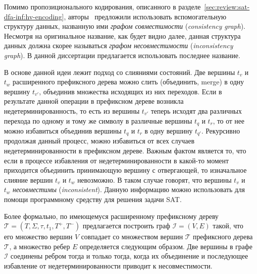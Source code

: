 Помимо пропозиционального кодирования, описанного в разделе~\ref{sec:review:sat-dfa-inf:hv-encoding}, авторы~\cite{heule-icgi10} предложили использовать вспомогательную структуру данных, названную ими \emph{графом совместимости} (\emph{consistency graph}).
Несмотря на оригинальное название, как будет видно далее, данная структура данных должна скорее называться \emph{графом несовместимости} (\emph{inconsistency graph}).
В данной диссертации предлагается использовать последнее название.

В основе данной идеи лежит подход со слияниями состояний.
Две вершины $t_{v}$ и $t_{w}$ расширенного префиксного дерева можно слить (объединить, merge) в одну вершину $t_{v'}$, объединив множества исходящих из них переходов.
Если в результате данной операции в префиксном дереве возникла недетерминированность, то есть из вершины $t_{v'}$ теперь исходят два различных перехода по одному и тому же символу в различные вершины $t_{q}$ и $t_{r}$, то от нее можно избавиться объединив вершины $t_{q}$ и $t_{r}$ в одну вершину $t_{q'}$. 
Рекурсивно продолжая данный процесс, можно избавиться от всех случаев недетерминированности в префиксном дереве.
Важным фактом является то, что если в процессе избавления от недетерминированности в какой-то момент приходится объединить принимающую вершину с отвергающей, то изначальное слияние вершин $t_{v}$ и $t_{w}$ невозможно.
В таком случае говорят, что вершины $t_{v}$ и $t_{w}$ \emph{несовместимы} (\emph{inconsistent}).
Данную информацию можно использовать для помощи программному средству для решения задачи SAT.

Более формально, по имеющемуся расширенному префиксному дереву $\mathcal{T} = \left(T,\Sigma,\tau,t_{1},T^{+},T^{-}\right)$ предлагается построить граф $\mathcal{I} = \left(V, E\right)$ такой, что его множество вершин $V$ совпадает со множеством вершин $\mathcal{T}$ префиксного дерева $\mathcal{T}$, а множество ребер $E$ определяется следующим образом. 
Две вершины в графе $\mathcal{I}$ соединены ребром тогда и только тогда, когда их объединение и последующее избавление от недетерминированности приводит к несовместимости. 


